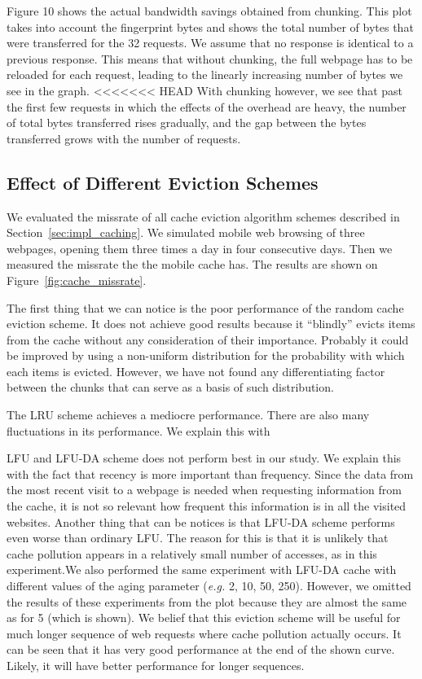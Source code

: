 Figure 10 shows the actual bandwidth savings obtained from chunking. This plot takes into account the fingerprint bytes and shows the total number of bytes that were transferred for the 32 requests.
We assume that no response is identical to a previous response. 
This means that without chunking, the full webpage has to be reloaded for each request, leading to the linearly increasing number of bytes we see in the graph. 
<<<<<<< HEAD
With chunking however, we see that past the first few requests in which the effects of the overhead are heavy, the number of total bytes transferred rises gradually, and the gap between the bytes transferred grows with the number of requests.

\subsection{Effect of Different Eviction Schemes}
We evaluated the missrate of  all cache eviction algorithm schemes described in Section~\ref{sec:impl_caching}. We
simulated mobile web browsing of three webpages, opening them three times a day in four consecutive days. Then we
measured the missrate the the mobile cache has. The results are shown on Figure~\ref{fig:cache_missrate}.

The first thing that we can notice is the poor performance of the random cache eviction scheme. It does not achieve 
good results because it ``blindly'' evicts items from the cache without any consideration of their importance. Probably
it could be improved by using a non-uniform distribution for the probability with which each items is evicted. However,
we have not found any differentiating factor between the chunks that can serve as a basis of such distribution.

The LRU scheme achieves a mediocre performance. There are also many fluctuations in its performance. We explain this
with 

LFU and LFU-DA scheme does not perform best in our study. We explain this with the fact that recency is more important
than frequency. Since the data from the most recent visit to a webpage is needed when requesting information from the 
cache, it is not so relevant how frequent this information is in all the visited websites. Another thing that can be
notices is that LFU-DA scheme performs even worse than ordinary LFU. The reason for this is that it is unlikely that
cache pollution appears in a relatively small number of accesses, as in this experiment.We also performed the same experiment with LFU-DA cache with different values of the aging parameter (\textit{e.g.} 2, 10, 50, 250). However, we omitted the results of these experiments from the plot because they are almost the same as for 5 (which is shown). We 
belief that this eviction scheme will be useful for much longer sequence of web requests where cache pollution actually occurs. It can be seen that it has very good performance at the end of the shown curve. Likely, it will have better performance for longer sequences.

